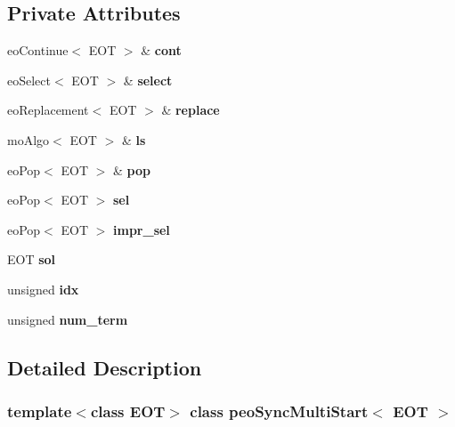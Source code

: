 \subsection*{Private Attributes}
\begin{CompactItemize}
\item 
eo\-Continue$<$ EOT $>$ \& {\bf cont}\label{classpeo_sync_multi_start_43f4fa9b125baef6fc8b968dfd16f437}

\item 
eo\-Select$<$ EOT $>$ \& {\bf select}\label{classpeo_sync_multi_start_8fc9a3d046023ddd077defec3c23ab3b}

\item 
eo\-Replacement$<$ EOT $>$ \& {\bf replace}\label{classpeo_sync_multi_start_a375ccea98e9bf2a0854dac27df4522f}

\item 
mo\-Algo$<$ EOT $>$ \& {\bf ls}\label{classpeo_sync_multi_start_4d317966de767dcc87eee0286ea7f95d}

\item 
eo\-Pop$<$ EOT $>$ \& {\bf pop}\label{classpeo_sync_multi_start_391178bd6b8a97a08ab4e345f070e967}

\item 
eo\-Pop$<$ EOT $>$ {\bf sel}\label{classpeo_sync_multi_start_dbcc1a069ec72ecd8d40c392640d84b3}

\item 
eo\-Pop$<$ EOT $>$ {\bf impr\_\-sel}\label{classpeo_sync_multi_start_ca10f6d258105e3c4f0d1660db5b7679}

\item 
EOT {\bf sol}\label{classpeo_sync_multi_start_2c2ebe46470d1425f0409897deab435b}

\item 
unsigned {\bf idx}\label{classpeo_sync_multi_start_64191ef79b7b589964ac9c3e23ae6718}

\item 
unsigned {\bf num\_\-term}\label{classpeo_sync_multi_start_773eb9097550d9444f25ca8f48997a30}

\end{CompactItemize}


\subsection{Detailed Description}
\subsubsection*{template$<$class EOT$>$ class peo\-Sync\-Multi\-Start$<$ EOT $>$}

